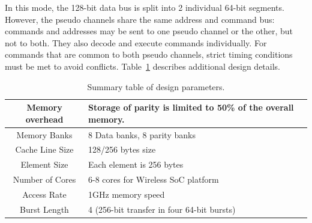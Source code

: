 In this mode, the 128-bit data bus is split into 2 individual 64-bit segments. 
However, the pseudo channels share the same address and command bus: commands and addresses may be sent to one pseudo channel or the other, but not to both. They also decode and execute commands individually. For commands that are common to both pseudo channels, strict timing conditions must be met to avoid conflicts.
Table~\ref{tab:design_params} describes additional design details.
%
\begin{table}[h!]
 \small
  \centering
  \begin{tabular}{|c|p{5cm}|}
    \hline
    Memory overhead & Storage of parity is limited to 50\% of the overall memory. \\
    \hline
    Memory Banks & 8 Data banks, 8 parity banks \\
    \hline           
    Cache Line Size & 128/256 bytes size \\ \hline  
    Element Size & Each element is 256 bytes \\ \hline  
    Number of Cores & 6-8 cores for Wireless SoC platform \\ \hline  
    Access Rate & 1GHz memory speed \\ \hline  
    Burst Length & 4 (256-bit transfer in four 64-bit bursts)\\ \hline
  \end{tabular}
  \caption{Summary table of design parameters.}
  \label{tab:design_params}
\end{table}



